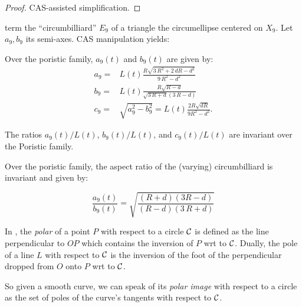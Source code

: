 \begin{proof} 
CAS-assisted simplification.
\end{proof}

\cite{reznik2021-circum} term the ``circumbilliard'' $E_9$ of a triangle the circumellipse centered on $X_9$. Let $a_9,b_9$ its semi-axes. CAS manipulation yields:

\begin{corollary}
Over the poristic family, $a_9(t)$ and $b_9(t)$ are given by:
\begin{align*}
a_9=&L(t)\frac{R\sqrt {3\,{R}^{2}+2\,dR-{d}^{2}} }{9\,{R}^{2}-{d}^{2}}\\
b_9=&  L(t)\frac{R\sqrt {R-d}}{\sqrt {3\,R+d} (3\,R-d)}\\
  c_9=&\sqrt{a_9^2-b_9^2}=L(t)\frac{2R\sqrt{dR}}{9R^2-d^2}.
\end{align*}
\end{corollary}

\begin{corollary}
The ratios $a_9(t)/L(t)$, $b_9(t)/L(t)$, and $c_9(t)/L(t)$ are invariant over the Poristic family.
\end{corollary}

\begin{corollary}
Over the poristic family, the aspect ratio of the (varying) circumbilliard is invariant and given by:

\begin{equation*}
\frac{a_9(t)}{b_9(t)}=\sqrt{\frac { \left(  R+d \right)  \left( 3R-d \right) }{ \left( R-d
 \right)  \left( 3\,R+d \right) }}
\end{equation*}
\end{corollary}

In \cite[Polar]{mw}, the {\em polar} of a point $P$ with respect to a circle $\mathcal{C}$ is defined as the line perpendicular to $O P$ which contains the inversion of $P$ wrt to $\mathcal{C}$. Dually, the pole of a line $L$ with respect to $\mathcal{C}$ is the inversion of the foot of the perpendicular dropped from $O$ onto $P$ wrt to $\mathcal{C}$.

So given a smooth curve, we can speak of its {\em polar image} with respect to a circle as the set of poles of the curve's tangents with respect to $\mathcal{C}$. 

